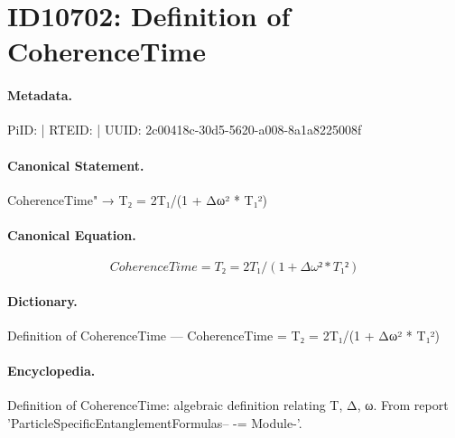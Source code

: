 \section*{ID10702: Definition of CoherenceTime}
\paragraph{Metadata.}
PiID:  | RTEID:  | UUID: 2c00418c-30d5-5620-a008-8a1a8225008f

\paragraph{Canonical Statement.}
CoherenceTime" → T₂ = 2T₁/(1 + Δω² * T₁²)

\paragraph{Canonical Equation.}
\[
CoherenceTime = T₂ = 2T₁/(1 + Δω² * T₁²)
\]

\paragraph{Dictionary.}
Definition of CoherenceTime — CoherenceTime = T₂ = 2T₁/(1 + Δω² * T₁²)

\paragraph{Encyclopedia.}
Definition of CoherenceTime: algebraic definition relating T, Δ, ω. From report 'ParticleSpecificEntanglementFormulas-- -= Module-'.
